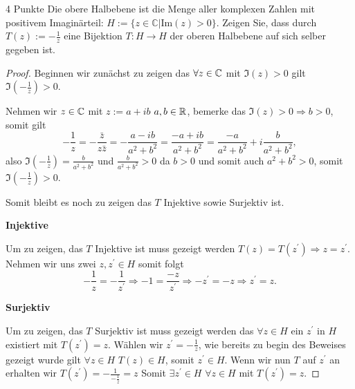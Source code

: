 \documentclass{../problemset}
\begin{document}
\begin{problem}{4 Punkte}
Die obere Halbebene ist die Menge aller komplexen Zahlen mit positivem Imaginärteil: $H := \{z \in \mathbb{C} | \text{Im}(z) > 0\}$. Zeigen Sie, dass durch $T(z) := -\frac{1}{z}$ eine Bijektion $T : H \rightarrow H$ der oberen Halbebene auf sich selber gegeben ist.

\begin{proof}
	Beginnen wir zunächst zu zeigen das $\forall z \in \mathbb{C}$ mit $\Im(z) > 0$ gilt $\Im(-\frac{1}{z}) > 0$.

	Nehmen wir $z \in \mathbb{C}$ mit $z := a + ib$ $a,b \in \mathbb{R}$, bemerke das
	$\Im(z) > 0 \Rightarrow b > 0$, somit gilt
	\[
		- \frac{1}{z} = - \frac{\bar{z}}{z\bar{z}} = - \frac{a - ib}{a^2 + b^2} = \frac{-a + ib}{a^2 + b^2} = \frac{-a}{a^2+b^2} + i\frac{b}{a^2+b^2},
	\] also $\Im(-\frac{1}{z}) = \frac{b}{a^2 + b^2}$ und $\frac{b}{a^2 + b^2} > 0$ da
	$b > 0$ und somit auch $a^2 + b^2 > 0$, somit $\Im(-\frac{1}{z}) > 0$.

	Somit bleibt es noch zu zeigen das $T$ Injektive sowie Surjektiv ist.

	\textbf{Injektive}

	Um zu zeigen, das $T$ Injektive ist muss gezeigt werden $T(z) = T(z^\prime)
		\Rightarrow z = z^\prime$. Nehmen wir uns zwei $z, z^\prime \in H$ somit folgt
	\[
		- \frac{1}{z} = - \frac{1}{z^\prime} \Rightarrow -1 = \frac{-z}{z^\prime} \Rightarrow -z^\prime = -z \Rightarrow z^\prime = z.
	\]

	\textbf{Surjektiv}

	Um zu zeigen, das $T$ Surjektiv ist muss gezeigt werden das $\forall z \in H$
	ein $z^\prime$ in $H$ existiert mit $T(z^\prime) = z$. Wählen wir $z^\prime = -
		\frac{1}{z}$, wie bereits zu begin des Beweises gezeigt wurde gilt $\forall z
		\in H$ $T(z) \in H$, somit $z^\prime \in H$. Wenn wir nun $T$ auf $z^\prime$ an
	erhalten wir $T(z^\prime) = -\frac{1}{-\frac{1}{z}} = z$ Somit $\exists
		z^\prime \in H$ $\forall z \in H$ mit $T(z^\prime) = z$.

\end{proof}
\end{problem}
\end{document}
